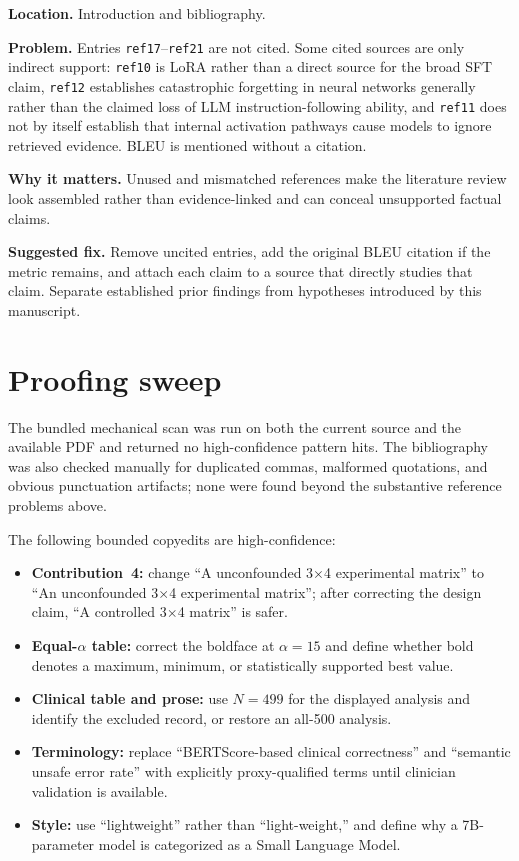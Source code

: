 \documentclass[11pt]{article}
\newcommand{\findinglabel}[1]{\textbf{#1}}
\begin{document}
\findinglabel{Location.} Introduction and bibliography.

\findinglabel{Problem.} Entries \texttt{ref17}--\texttt{ref21} are not cited.  Some cited sources are only indirect support: \texttt{ref10} is LoRA rather than a direct source for the broad SFT claim, \texttt{ref12} establishes catastrophic forgetting in neural networks generally rather than the claimed loss of LLM instruction-following ability, and \texttt{ref11} does not by itself establish that internal activation pathways cause models to ignore retrieved evidence.  BLEU is mentioned without a citation.

\findinglabel{Why it matters.} Unused and mismatched references make the literature review look assembled rather than evidence-linked and can conceal unsupported factual claims.

\findinglabel{Suggested fix.} Remove uncited entries, add the original BLEU citation if the metric remains, and attach each claim to a source that directly studies that claim.  Separate established prior findings from hypotheses introduced by this manuscript.

\section*{Proofing sweep}

The bundled mechanical scan was run on both the current source and the available PDF and returned no high-confidence pattern hits.  The bibliography was also checked manually for duplicated commas, malformed quotations, and obvious punctuation artifacts; none were found beyond the substantive reference problems above.

The following bounded copyedits are high-confidence:
\begin{itemize}
    \item \textbf{Contribution~4:} change ``A unconfounded 3$\times$4 experimental matrix'' to ``An unconfounded 3$\times$4 experimental matrix''; after correcting the design claim, ``A controlled 3$\times$4 matrix'' is safer.
    \item \textbf{Equal-$\alpha$ table:} correct the boldface at $\alpha=15$ and define whether bold denotes a maximum, minimum, or statistically supported best value.
    \item \textbf{Clinical table and prose:} use $N=499$ for the displayed analysis and identify the excluded record, or restore an all-500 analysis.
    \item \textbf{Terminology:} replace ``BERTScore-based clinical correctness'' and ``semantic unsafe error rate'' with explicitly proxy-qualified terms until clinician validation is available.
    \item \textbf{Style:} use ``lightweight'' rather than ``light-weight,'' and define why a 7B-parameter model is categorized as a Small Language Model.
\end{itemize}
\end{document}
